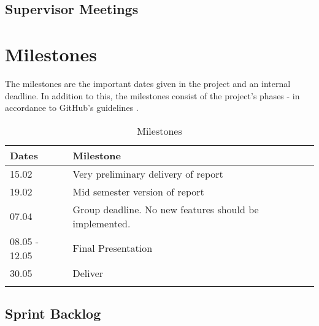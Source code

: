 \subsection{Supervisor Meetings}

\section{Milestones}
The milestones are the important dates given in the project and an internal deadline. In addition to this, the milestones consist of the project's phases - in accordance to GitHub's guidelines \cite{GitHubGuide}. 

\begin{longtable}{|l|l|}
\hline
\rowcolor{Gray}
\textbf{Dates} & \textbf{Milestone} \\
\hline
15.02 & Very preliminary delivery of report \\
\hline
19.02 & Mid semester version of report\\
\hline
07.04 & Group deadline. No new features should be implemented. \\
\hline
08.05 - 12.05 & Final Presentation \\
\hline
30.05 & Deliver  \\
\hline
\caption{Milestones}
\end{longtable}

\subsection{Sprint Backlog}




\cleardoublepage